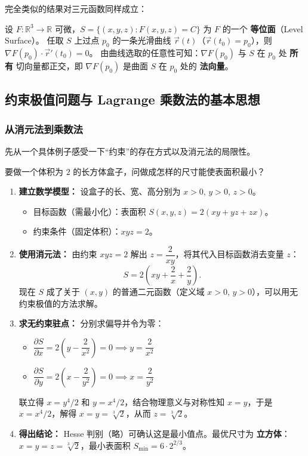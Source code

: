 \documentclass[lang=cn,11pt]{elegantbook}
\begin{document}
完全类似的结果对三元函数同样成立：

\begin{note}[梯度垂直于等位面]
设 $F:\mathbb R^3\to\mathbb R$ 可微，$S=\{(x,y,z):F(x,y,z)=C\}$ 为 $F$ 的一个 \textbf{等位面}（Level Surface）。
任取 $S$ 上过点 $p_0$ 的一条光滑曲线 $\vec r(t)$（$\vec r(t_0)=p_0$），则 $\nabla F(p_0)\cdot\vec r'(t_0)=0$。
由曲线选取的任意性可知：$\nabla F(p_0)$ 与 $S$ 在 $p_0$ 处 \textbf{所有} 切向量都正交，即 $\nabla F(p_0)$ 是曲面 $S$ 在 $p_0$ 处的 \textbf{法向量}。
\end{note}


\subsection{约束极值问题与 Lagrange 乘数法的基本思想}

\subsubsection*{从消元法到乘数法}

先从一个具体例子感受一下“约束”的存在方式以及消元法的局限性。

\begin{example}[长方体的表面积最小化] \label{ex:box-surface-minimum}
要做一个体积为 $2$ 的长方体盒子，问做成怎样的尺寸能使表面积最小？
\end{example}

\begin{solution}
\begin{enumerate}
  \item \textbf{建立数学模型：} 设盒子的长、宽、高分别为 $x>0$, $y>0$, $z>0$。
  \begin{itemize}
    \item 目标函数（需最小化）：表面积 $S(x,y,z)=2(xy+yz+zx)$。
    \item 约束条件（固定体积）：$xyz=2$。
  \end{itemize}
  \item \textbf{使用消元法：} 由约束 $xyz=2$ 解出 $z=\dfrac{2}{xy}$，将其代入目标函数消去变量 $z$：
  \[
  S=2\left(xy+\frac{2}{x}+\frac{2}{y}\right).
  \]
  现在 $S$ 成了关于 $(x,y)$ 的普通二元函数（定义域 $x>0$, $y>0$），可以用无约束极值的方法求解。
  \item \textbf{求无约束驻点：} 分别求偏导并令为零：
  \begin{itemize}
    \item $\dfrac{\partial S}{\partial x}=2\left(y-\dfrac{2}{x^2}\right)=0 \implies y=\dfrac{2}{x^2}$
    \item $\dfrac{\partial S}{\partial y}=2\left(x-\dfrac{2}{y^2}\right)=0 \implies x=\dfrac{2}{y^2}$
  \end{itemize}
  联立得 $x=y^4/2$ 和 $y=x^4/2$，结合物理意义与对称性知 $x=y$，于是 $x=x^4/2$，解得 $x=y=\sqrt[3]{2}$，从而 $z=\sqrt[3]{2}$。
  \item \textbf{得出结论：} Hesse 判别（略）可确认这是最小值点。最优尺寸为 \textbf{立方体}：$x=y=z=\sqrt[3]{2}$，最小表面积 $S_{\min}=6\cdot 2^{2/3}$。
\end{enumerate}
\end{solution}
\end{document}
